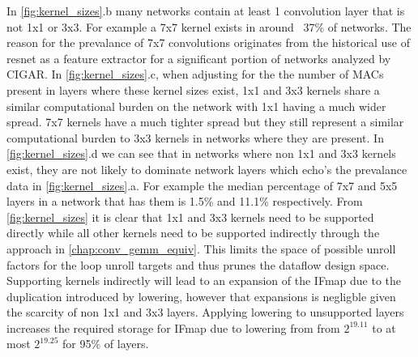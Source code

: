 In \autoref{fig:kernel_sizes}.b many networks contain at least 1 convolution
layer that is not 1x1 or 3x3. For example a 7x7 kernel exists in around ~37\% of
networks. The reason for the prevalance of 7x7 convolutions originates from the
historical use of resnet \cite{resnet} as a feature extractor for a significant
portion of networks analyzed by CIGAR. In \autoref{fig:kernel_sizes}.c, when
adjusting for the the number of MACs present in layers where these kernel sizes
exist, 1x1 and 3x3 kernels share a similar computational burden on the network
with 1x1 having a much wider spread. 7x7 kernels have a much tighter spread but
they still represent a similar computational burden to 3x3 kernels in networks
where they are present. In \autoref{fig:kernel_sizes}.d we can see that in
networks where non 1x1 and 3x3 kernels exist, they are not likely to dominate
network layers which echo's the prevalance data in \autoref{fig:kernel_sizes}.a.
For example the median percentage of 7x7 and 5x5 layers in a network that has
them is 1.5\% and 11.1\% respectively.
From \autoref{fig:kernel_sizes} it is clear that 1x1 and 3x3 kernels need to be
supported directly while all other kernels need to be supported indirectly
through the approach in \autoref{chap:conv_gemm_equiv}. This limits the space of
possible unroll factors for the loop unroll targets and thus prunes the dataflow
design space. Supporting kernels indirectly will lead to an expansion of the
IFmap due to the duplication introduced by lowering, however that expansions is
negligble given the scarcity of non 1x1 and 3x3 layers. Applying lowering to
unsupported layers increases the required storage for IFmap due to lowering from 
from $2^{19.11}$ to at most $2^{19.25}$ for 95\% of layers.

